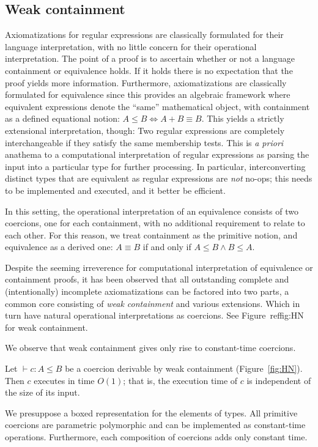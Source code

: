 \subsection{Weak containment}

Axiomatizations for regular expressions are classically formulated for their language interpretation, with no little concern for their operational interpretation. The point of a proof is to ascertain whether or not a language containment or equivalence holds.  If it holds there is no expectation that the proof yields more information. Furthermore, axiomatizations are classically formulated for equivalence since this provides an algebraic framework where equivalent expressions denote the ``same'' mathematical object, with containment as a defined equational notion: $A \leq B \Leftrightarrow A + B \equiv B$.  This yields a strictly extensional interpretation, though: Two regular expressions are completely interchangeable if they satisfy the same membership tests.  This is \emph{a priori} anathema to a computational interpretation of regular expressions as parsing the input into a particular type for further processing.  In particular, interconverting distinct types that are equivalent as regular expressions are \emph{not} no-ops; this needs to be implemented and executed, and it better be efficient. 

In this setting, the operational interpretation of an equivalence consists of two coercions, one for each containment, with no additional requirement to relate to each other.  For this reason, we treat containment as the primitive notion, and equivalence as a derived one:
$A \equiv B$ if and only if $A \leq B \wedge B \leq A$.  

Despite the seeming irreverence for computational interpretation of equivalence or containment proofs, it has been observed \cite{heni2011} that all outstanding complete \cite{salomaa66,kozen94,boffa1995,grabmayer2005} and (intentionally) incomplete \cite{conway71,pratt90,bcg2007} axiomatizations can be factored into two parts, a common core consisting of \emph{weak containment} and various extensions.
Which in turn have natural operational interpretations as coercions.  See Figure~ref{fig:HN} for weak containment.  

We observe that weak containment gives only rise to constant-time coercions.

\begin{proposition}
Let $\vdash c : A \leq B$ be a coercion  derivable by weak containment (Figure~\ref{fig:HN}).
Then $c$ executes in time $O(1)$; that is, the execution time of $c$ is independent of the size of its input.
\end{proposition}
We presuppose a boxed representation for the elements of types. All primitive coercions are parametric polymorphic and can be implemented as constant-time operations.  Furthermore, each composition of coercions adds only constant time.

